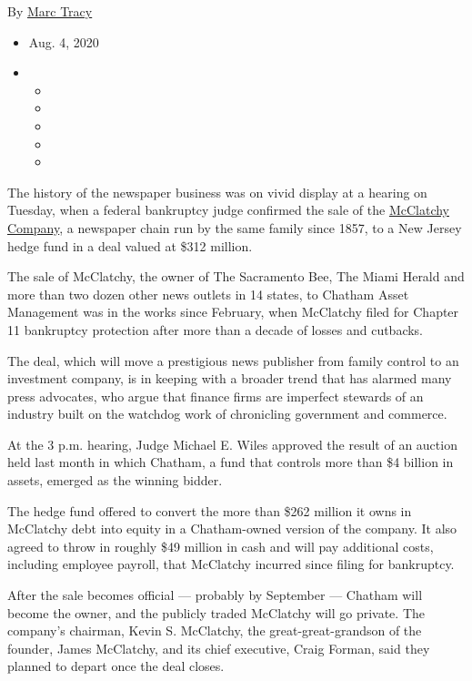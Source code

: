 By \href{https://www.nytimes3xbfgragh.onion/by/marc-tracy}{Marc Tracy}

\begin{itemize}
\item
  Aug. 4, 2020
\item
  \begin{itemize}
  \item
  \item
  \item
  \item
  \item
  \end{itemize}
\end{itemize}

The history of the newspaper business was on vivid display at a hearing
on Tuesday, when a federal bankruptcy judge confirmed the sale of the
\href{https://www.nytimes3xbfgragh.onion/2020/07/12/business/media/hedge-fund-mcclatchy-newspapers.html}{McClatchy
Company}, a newspaper chain run by the same family since 1857, to a New
Jersey hedge fund in a deal valued at \$312 million.

The sale of McClatchy, the owner of The Sacramento Bee, The Miami Herald
and more than two dozen other news outlets in 14 states, to Chatham
Asset Management was in the works since February, when McClatchy filed
for Chapter 11 bankruptcy protection after more than a decade of losses
and cutbacks.

The deal, which will move a prestigious news publisher from family
control to an investment company, is in keeping with a broader trend
that has alarmed many press advocates, who argue that finance firms are
imperfect stewards of an industry built on the watchdog work of
chronicling government and commerce.

At the 3 p.m. hearing, Judge Michael E. Wiles approved the result of an
auction held last month in which Chatham, a fund that controls more than
\$4 billion in assets, emerged as the winning bidder.

The hedge fund offered to convert the more than \$262 million it owns in
McClatchy debt into equity in a Chatham-owned version of the company. It
also agreed to throw in roughly \$49 million in cash and will pay
additional costs, including employee payroll, that McClatchy incurred
since filing for bankruptcy.

After the sale becomes official --- probably by September --- Chatham
will become the owner, and the publicly traded McClatchy will go
private. The company's chairman, Kevin S. McClatchy, the
great-great-grandson of the founder, James McClatchy, and its chief
executive, Craig Forman, said they planned to depart once the deal
closes.

